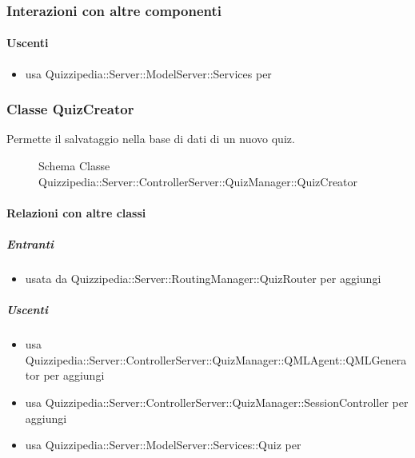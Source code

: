 \subsubsection{Interazioni con altre componenti}
\paragraph{Uscenti}
\begin{itemize}
\item usa Quizzipedia::Server::ModelServer::Services per 
\end{itemize}
\subsubsection{Classe QuizCreator}
Permette il salvataggio nella base di dati di un nuovo quiz.
\begin{figure}[H]
\centering
\noindent{}
\caption[Schema Classe QuizCreator]{Schema Classe Quizzipedia::Server::ControllerServer::QuizManager::QuizCreator}
\end{figure}
\paragraph{Relazioni con altre classi}
\subparagraph{Entranti}
\begin{itemize}
\item usata da Quizzipedia::Server::RoutingManager::QuizRouter per aggiungi
\end{itemize}
\subparagraph{Uscenti}
\begin{itemize}
\item usa Quizzipedia::Server::ControllerServer::QuizManager::QMLAgent::QMLGenerator per aggiungi
\item usa Quizzipedia::Server::ControllerServer::QuizManager::SessionController per aggiungi
\item usa Quizzipedia::Server::ModelServer::Services::Quiz per 
\end{itemize}
